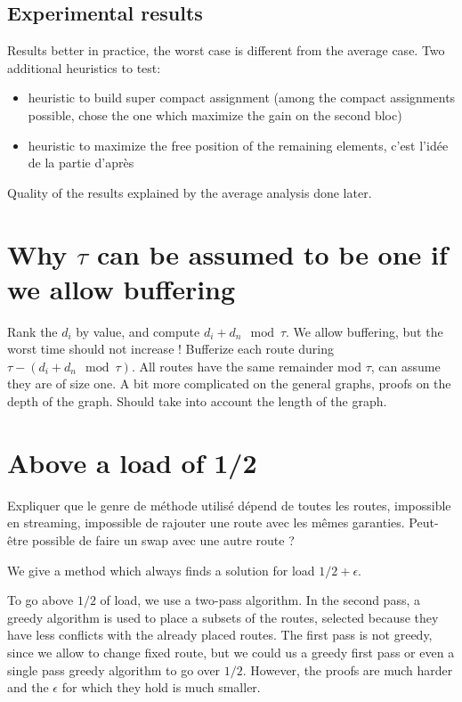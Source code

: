 \documentclass[10pt, conference, letterpaper]{IEEEtran}
\begin{document}
\subsection{Experimental results}

Results better in practice, the worst case is different from the 
average case.
Two additional heuristics to test:
\begin{itemize}
	\item  heuristic to build super compact assignment (among the compact assignments
possible, chose the one which maximize the gain on the second bloc)
	\item heuristic to maximize the free position of the remaining elements, c'est l'idée
	de la partie d'après
\end{itemize}

Quality of the results explained by the average analysis done later.
 

\section{Why $\tau$ can be assumed to be one if we allow buffering}

Rank the $d_i$ by value, and compute $d_i + d_n \mod \tau$.
We allow buffering, but the worst time should not increase !
Bufferize  each route during $\tau - (d_i + d_n \mod \tau)$.
All routes have the same remainder mod $\tau$, can assume they are of 
size one.
A bit more complicated on the general graphs, proofs on the depth of the graph. 
Should take into account the length of the graph.


\section{Above a load of 1/2}


Expliquer que le genre de méthode utilisé dépend de toutes les routes,
impossible en streaming, impossible de rajouter une route avec les mêmes garanties.
Peut-être possible de faire un swap avec une autre route ?


We  give a method which always finds a solution for load $1/2 + \epsilon$.


To go above $1/2$ of load, we use a two-pass algorithm. In the second pass, a greedy algorithm is used 
to place a subsets of the routes, selected because they have less conflicts with the already placed 
routes. The first pass is not greedy, since we allow to change fixed route, but we could us a greedy first
pass or even a single pass greedy algorithm to go over $1/2$. However, the proofs are much harder and 
the $\epsilon$ for which they hold is much smaller.
\end{document}
